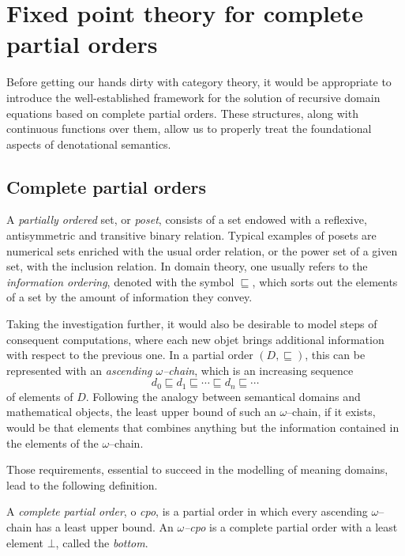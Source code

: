 \section[Fixed point theory for cpos]%
{Fixed point theory for complete partial orders}

Before getting our hands dirty with category theory, it would be appropriate to
introduce the well-established framework for the solution of recursive domain
equations based on complete partial orders.
These structures, along with continuous functions over them, allow us to properly treat the foundational aspects of denotational semantics.

\subsection[]{Complete partial orders}

A \emph{partially ordered} set, or \emph{poset}, consists of a set endowed with
a reflexive, antisymmetric and transitive binary relation. Typical examples of posets are numerical sets enriched with the usual order relation, or the power set of a given set, with the inclusion relation.
In domain theory, one usually refers to the \emph{information ordering}, denoted with the symbol \({}\sqsubseteq{}\), which sorts out the elements of a set by the amount of information they convey.

Taking the investigation further, it would also be desirable to model steps of consequent computations, where each new objet brings additional information with respect to the previous one.
In a partial order \((D, {}\sqsubseteq)\), this can be represented with an
\emph{ascending \(\omega\)--chain}, which is an increasing sequence
\begin{equation*}
  d_0 \sqsubseteq d_1 \sqsubseteq \dotsb \sqsubseteq d_n \sqsubseteq \dotsb{}
\end{equation*}
of elements of \(D\).
Following the analogy between semantical domains and mathematical objects, the least upper bound of such an \(\omega\)--chain, if it exists, would be that elements that combines anything but the information contained in the elements of the \(\omega\)--chain.

Those requirements, essential to succeed in the modelling of meaning domains, lead to the following definition.

\begin{dfn}
  A \emph{complete partial order}, o \emph{cpo}, is a partial order in which every ascending \(\omega\)--chain has a least upper bound.
  An \emph{\(\omega\)--cpo} is a complete partial order with a least element
  \(\bot\), called the \emph{bottom}.
\end{dfn}

